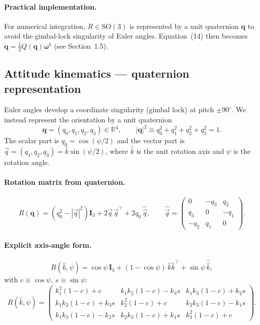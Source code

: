 \documentclass[11pt]{article}
\newcommand{\vect}[1]{\bm{#1}}
\newcommand{\T}{^{\!\top}}
\begin{document}
\paragraph{Practical implementation.} For numerical integration, $R\in\mathrm{SO}(3)$ is represented by a unit quaternion $\vect q$ to avoid the gimbal-lock singularity of Euler angles. Equation~(14) then becomes $\dot{\vect q}=\tfrac12 Q(\vect q)\vect\omega^b$ (see Section~1.5).

\subsection{Attitude kinematics --- quaternion representation}
Euler angles develop a coordinate singularity (gimbal lock) at pitch $\pm90^\circ$. We instead represent the orientation by a unit quaternion
\begin{equation}
  \vect q=(q_0,q_1,q_2,q_3)\in\mathbb R^4,\qquad |\vect q|^2\equiv q_0^2+q_1^2+q_2^2+q_3^2=1.
\end{equation}
The scalar part is $q_0=\cos(\psi/2)$ and the vector part is $\vec q=(q_1,q_2,q_3)=\hat k\sin(\psi/2)$, where $\hat k$ is the unit rotation axis and $\psi$ is the rotation angle.

\paragraph{Rotation matrix from quaternion.}
\begin{equation}
  R(\vect q) = (q_0^2-|\vec q|^2)\mathbf I_3+2\vec q\,\vec q\T+2q_0\,\widehat{\vec q},\qquad
  \widehat{\vec q}=\begin{pmatrix}0 & -q_3 & q_2\\ q_3 & 0 & -q_1\\ -q_2 & q_1 & 0\end{pmatrix}.
\end{equation}

\paragraph{Explicit axis-angle form.}
\begin{equation}
  R(\hat k,\psi) = \cos\psi\,\mathbf I_3+(1-\cos\psi)\,\hat k\hat k\T+\sin\psi\,\widehat{\hat k},
\end{equation}
with $c\equiv\cos\psi$, $s\equiv\sin\psi$:
\begin{equation}
  R(\hat k,\psi) = \begin{pmatrix}
    k_1^2(1-c)+c & k_1k_2(1-c)-k_3s & k_1k_3(1-c)+k_2s\\
    k_1k_2(1-c)+k_3s & k_2^2(1-c)+c & k_2k_3(1-c)-k_1s\\
    k_1k_3(1-c)-k_2s & k_2k_3(1-c)+k_1s & k_3^2(1-c)+c\end{pmatrix}.
\end{equation}
\end{document}
